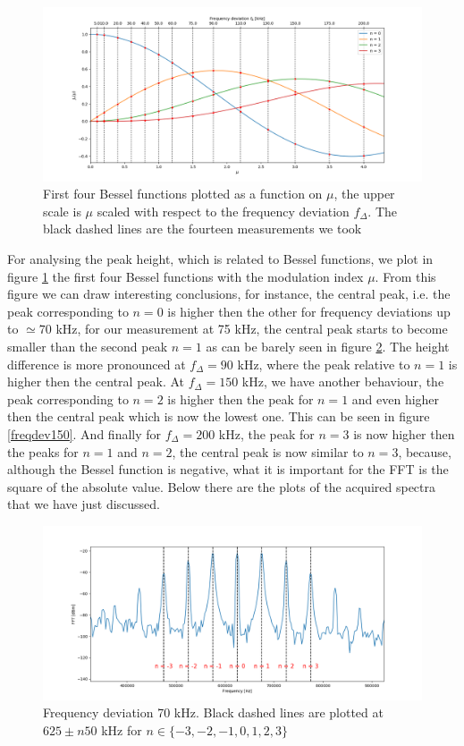 \documentclass[a4paper,10pt]{article}
\begin{document}
\begin{figure}[H]
\hspace{-4.5em}\includegraphics[width=1.2\textwidth]{bessel}
\caption{First four Bessel functions plotted as a function on $\mu$, the upper scale is $\mu$ scaled with respect to the frequency deviation $f_\Delta$. The black dashed lines are the fourteen measurements we took}\label{bessel}
\end{figure}
For analysing the peak height, which is related to Bessel functions, we plot in figure \ref{bessel} the first four Bessel functions with the modulation index  $\mu$. From this figure we can draw interesting conclusions, for instance, the central peak, i.e. the peak corresponding to $n=0$ is higher then the other for frequency deviations up to $\simeq 70$ kHz, for our measurement at 75 kHz, the central peak starts to become smaller than the second peak $n=1$ as can be barely seen in figure \ref{freqdev75}. The height difference is more pronounced at $f_\Delta = 90$ kHz, where the peak relative to $n=1$ is higher then the central peak. At $f_\Delta = 150$ kHz, we have another behaviour, the peak corresponding to $n=2$ is higher then the peak for $n=1$ and even higher then the central peak which is now the lowest one. This can be seen in figure  \ref{freqdev150}. And finally for $f_\Delta = 200$ kHz, the peak for $n=3$ is now higher then the peaks for $n=1$ and $n=2$, the central peak is now similar to $n=3$, because, although the Bessel function is negative, what it is important for the FFT is the square of the absolute value. Below there are the plots of the acquired spectra that we have just discussed.
\begin{figure}[H]
\centering
\includegraphics[width=\textwidth]{freqdev75}
\caption{Frequency deviation 70 kHz. Black dashed lines are plotted at $625\pm n50$ kHz for $n\in\{-3,-2,-1,0,1,2,3\}$}\label{freqdev75}
\end{figure}
\end{document}
